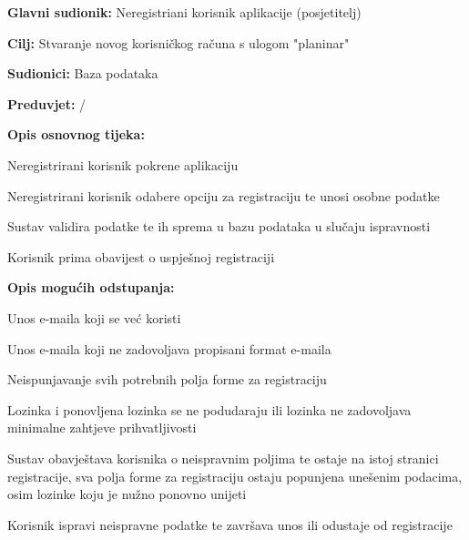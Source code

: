 				
				\noindent {}
			\begin{packed_item}
				
				\item \textbf{Glavni sudionik: }$ $Neregistriani korisnik aplikacije (posjetitelj)$ $
				\item  \textbf{Cilj:} $ $Stvaranje novog korisničkog računa s ulogom "planinar"$ $
				\item  \textbf{Sudionici:} $ $Baza podataka$ $
				\item  \textbf{Preduvjet:} $ $/$ $
				\item  \textbf{Opis osnovnog tijeka:}
				
				\item[] \begin{packed_enum}
					
					\item $ $Neregistrirani korisnik pokrene aplikaciju$ $
					\item $ $Neregistrirani korisnik odabere opciju za registraciju te unosi osobne podatke$ $
					\item $ $Sustav validira podatke te ih sprema u bazu podataka u slučaju ispravnosti$ $
					\item $ $Korisnik prima obavijest o uspješnoj registraciji$ $
				\end{packed_enum}
				
				\item  \textbf{Opis mogućih odstupanja:}
				
				\item[] \begin{packed_item}
					
					\item[3.a] $ $Unos e-maila koji se već koristi$ $
					\item[3.b] $ $Unos e-maila koji ne zadovoljava propisani format e-maila$ $
					\item[3.c] $ $Neispunjavanje svih potrebnih polja forme za registraciju$ $
					\item[3.d] $ $Lozinka i ponovljena lozinka se ne podudaraju ili lozinka ne zadovoljava minimalne zahtjeve prihvatljivosti$ $
					
					\item[] \begin{packed_enum}
						
						\item $ $Sustav obavještava korisnika o neispravnim poljima te ostaje na istoj stranici registracije, sva polja forme za registraciju ostaju popunjena unešenim podacima, osim lozinke koju je nužno ponovno unijeti$ $
						\item $ $Korisnik ispravi neispravne podatke te završava unos ili odustaje od registracije$ $
						
					\end{packed_enum}
				\end{packed_item}
			\end{packed_item}
		
